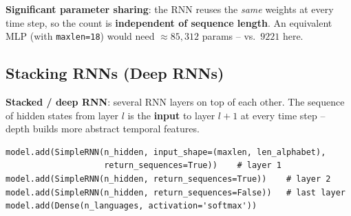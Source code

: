 \documentclass[10pt,a4paper]{article}
\begin{document}
	\begin{importantbox}
		\textbf{Significant parameter sharing}: the RNN reuses the \emph{same} weights at every time step, so the count is \textbf{independent of sequence length}. An equivalent MLP (with \texttt{maxlen=18}) would need $\approx 85{,}312$ params -- vs.\ $9221$ here.
	\end{importantbox}

	\subsection{Stacking RNNs (Deep RNNs)}

	\begin{definitionbox}
		\textbf{Stacked / deep RNN}: several RNN layers on top of each other. The sequence of hidden states from layer $l$ is the \textbf{input} to layer $l{+}1$ at every time step -- depth builds more abstract temporal features.
	\end{definitionbox}

	\begin{center}
	\end{center}

\begin{verbatim}
model.add(SimpleRNN(n_hidden, input_shape=(maxlen, len_alphabet),
                    return_sequences=True))    # layer 1
model.add(SimpleRNN(n_hidden, return_sequences=True))    # layer 2
model.add(SimpleRNN(n_hidden, return_sequences=False))   # last layer
model.add(Dense(n_languages, activation='softmax'))
\end{verbatim}
\end{document}
